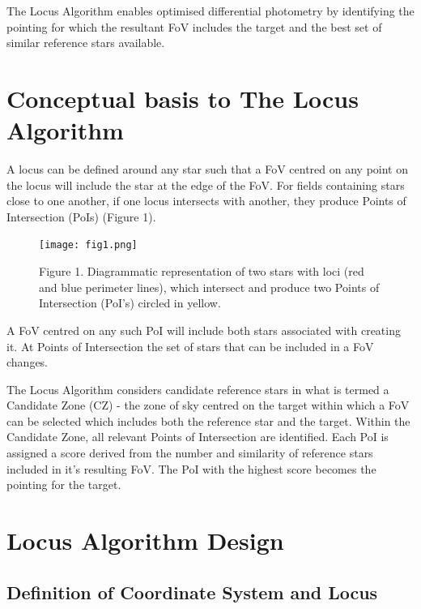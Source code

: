 \documentclass[]{elsarticle} %
\begin{document}
The Locus Algorithm enables optimised differential photometry by
identifying the pointing for which the resultant FoV includes the target
and the best set of similar reference stars available.

\hypertarget{conceptual-basis-to-the-locus-algorithm}{%
\section{Conceptual basis to The Locus
Algorithm}\label{conceptual-basis-to-the-locus-algorithm}}

A locus can be defined around any star such that a FoV centred on any
point on the locus will include the star at the edge of the FoV. For
fields containing stars close to one another, if one locus intersects
with another, they produce Points of Intersection (PoIs) (Figure 1).

\begin{figure}
\centering
\texttt{[image: fig1.png]}
\caption{Figure 1. Diagrammatic representation of two stars with loci
(red and blue perimeter lines), which intersect and produce two Points
of Intersection (PoI's) circled in yellow.}
\end{figure}

A FoV centred on any such PoI will include both stars associated with
creating it. At Points of Intersection the set of stars that can be
included in a FoV changes.

The Locus Algorithm considers candidate reference stars in what is
termed a Candidate Zone (CZ) - the zone of sky centred on the target
within which a FoV can be selected which includes both the reference
star and the target. Within the Candidate Zone, all relevant Points of
Intersection are identified. Each PoI is assigned a score derived from
the number and similarity of reference stars included in it's resulting
FoV. The PoI with the highest score becomes the pointing for the target.

\hypertarget{locus-algorithm-design}{%
\section{Locus Algorithm Design}\label{locus-algorithm-design}}

\hypertarget{definition-of-coordinate-system-and-locus}{%
\subsection{Definition of Coordinate System and
Locus}\label{definition-of-coordinate-system-and-locus}}
\end{document}
